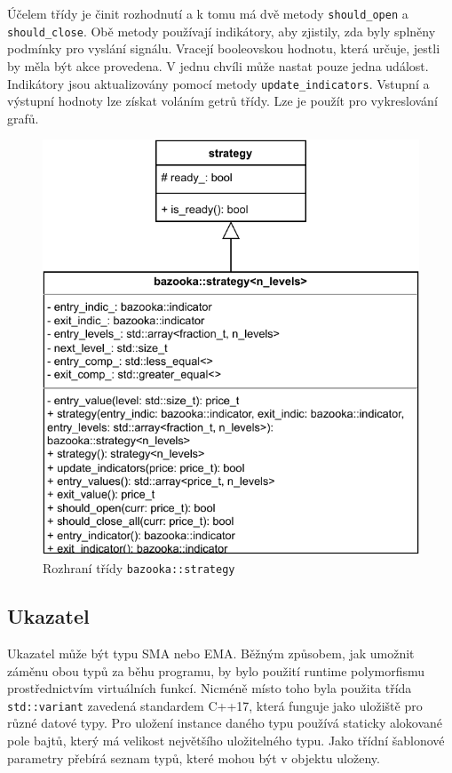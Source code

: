 Účelem třídy je činit rozhodnutí a k tomu má dvě metody \texttt{should\_open} a \texttt{should\_close}.
Obě metody používají indikátory, aby zjistily, zda byly splněny podmínky pro vyslání signálu.
Vracejí booleovskou hodnotu, která určuje, jestli by měla být akce provedena.
V jednu chvíli může nastat pouze jedna událost.
Indikátory jsou aktualizovány pomocí metody \texttt{update\_indicators}.
Vstupní a výstupní hodnoty lze získat voláním getrů třídy.
Lze je použít pro vykreslování grafů.

\begin{figure}[htbp]
\centerline{\includegraphics[scale=0.85]{img/bazooka-strategy-uml.pdf}}
\caption{Rozhraní třídy \texttt{bazooka::strategy}}
\label{fig:bazooka:strategy:uml}
\end{figure}

\subsection{Ukazatel}
Ukazatel může být typu SMA nebo EMA.
Běžným způsobem, jak umožnit záměnu obou typů za běhu programu, by bylo použití runtime polymorfismu prostřednictvím virtuálních funkcí.
Nicméně místo toho byla použita třída \texttt{std::variant} zavedená standardem C++17, která funguje jako uložiště pro různé datové typy.
Pro uložení instance daného typu používá staticky alokované pole bajtů, který má velikost největšího uložitelného typu.
Jako třídní šablonové parametry přebírá seznam typů, které mohou být v objektu uloženy.

